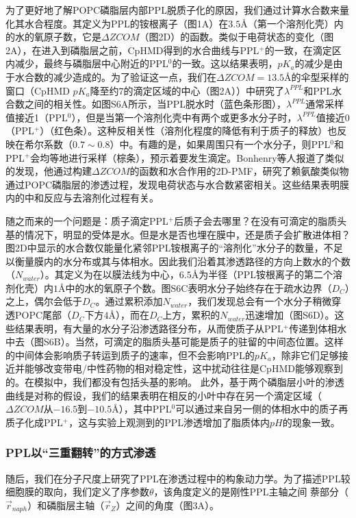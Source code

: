 \documentclass[journal=,manuscript=artical,email=false]{achemso}
\begin{document}
为了更好地了解POPC磷脂层内部PPL脱质子化的原因，我们通过计算水合数来量化其水合程度。其定义为PPL的铵根离子（图1A）在$3.5$\AA（第一个溶剂化壳）内的水的氧原子数，它是$\Delta ZCOM$（图2D）的函数。类似于电荷状态的变化（图2A），在进入到磷脂层之前，CpHMD得到的水合曲线与PPL$^{+}$的一致，在滴定区内减少，最终与磷脂层中心附近的PPL$^{0}$的一致。这以结果表明，$pK_a$的减少是由于水合数的减少造成的。为了验证这一点，我们在$\Delta ZCOM= 13.5$\AA 的伞型采样的窗口（CpHMD $pK_a$降至约$7$的滴定区域的中心（图2A））中研究了$\lambda ^{PPL}$和PPL水合数之间的相关性。如图S6A所示，当PPL脱水时（蓝色条形图），$\lambda ^{PPL}$通常采样值接近1（PPL$^0$），但是当第一个溶剂化壳中有两个或更多水分子时，$\lambda ^{PPL}$值接近0（PPL$^{+}$）（红色条）。这种反相关性（溶剂化程度的降低有利于质子的释放）也反映在希尔系数（$0.7\sim 0.8$）中。有趣的是，如果周围只有一个水分子，则PPL$^{0}$和PPL$^{+}$会均等地进行采样（棕条），预示着要发生滴定。Bonhenry等人报道了类似的发现，他通过构建$\Delta ZCOM$的函数和水合作用的2D-PMF，研究了赖氨酸类似物通过POPC磷脂层的渗透过程，发现电荷状态与水合数紧密相关。这些结果表明膜内的中和反应与去溶剂化过程有关。

随之而来的一个问题是：质子滴定PPL$^{+}$后质子会去哪里？在没有可滴定的脂质头基的情况下，明显的受体是水。但是水是否也埋在膜中，还是质子会扩散进体相？图2D中显示的水合数仅能量化紧邻PPL铵根离子的“溶剂化”水分子的数量，不足以衡量膜内的水分布或其与体相水。因此我们沿着其渗透路径的方向上数水的个数（$N_{water}$）。其定义为在以膜法线为中心，$6.5$\AA 为半径（PPL铵根离子的第二个溶剂化壳）内$1$\AA 中的水的氧原子个数。图S6C表明水分子始终存在于疏水边界（$D_C$）之上，偶尔会低于$D_C$。通过累积添加$N_{water}$，我们发现总会有一个水分子稍微穿透POPC尾部（$D_C$下方$4$\AA ），而在$D_C$上方，累积的$N_{water}$迅速增加（图S6D）。这些结果表明，有大量的水分子沿渗透路径分布，从而使质子从PPL$^{+}$传递到体相水中去（图S6B）。当然，可滴定的脂质头基可能是质子的驻留的中间态位置。这样的中间体会影响质子转运到质子的速率，但不会影响PPL的$pK_a$，除非它们足够接近并能够改变带电/中性药物的相对稳定性，这中扰动往往是CpHMD能够观察到的。在模拟中，我们都没有包括头基的影响。
此外，基于两个磷脂层小叶的渗透曲线是对称的假设，我们的结果表明在相反的小叶中存在另一个滴定区域（$\Delta ZCOM$从$-16.5$到$-10.5$\AA ），其中PPL$^{0}$可以通过来自另一侧的体相水中的质子再质子化成PPL$^{+}$，这与实验上观测到的PPL渗透增加了脂质体内$pH$的现象一致。

\subsubsection{PPL以“三重翻转”的方式渗透}
随后，我们在分子尺度上研究了PPL在渗透过程中的构象动力学。为了描述PPL较细胞膜的取向，我们定义了序参数$\theta$，该角度定义的是刚性PPL主轴之间
萘部分（$\vec{r}_{naph}$）和磷脂层主轴（$\vec{r}_Z$）之间的角度（图3A）。
\end{document}
